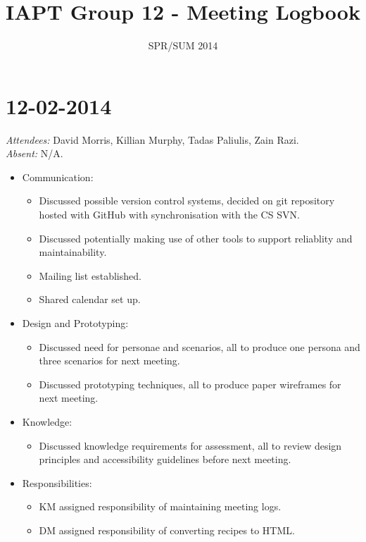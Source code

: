 \documentclass{article}
\title{IAPT Group 12 - Meeting Logbook}
\date{SPR/SUM 2014}
\begin{document}
\maketitle
\clearpage

\section*{12-02-2014}
\vspace{.5cm}
\emph{Attendees: }David Morris, Killian Murphy, Tadas Paliulis, Zain Razi.
\\
\emph{Absent: }N/A.

\begin{itemize}
\item Communication: 
  \begin {itemize}
  \item Discussed possible version control systems, decided on git repository hosted with GitHub with synchronisation with the CS SVN. 
  \item Discussed potentially making use of other tools to support reliablity and maintainability.
  \item Mailing list established.
  \item Shared calendar set up.
  \end{itemize}
\item Design and Prototyping:
  \begin{itemize}
  \item Discussed need for personae and scenarios, all to produce one persona and three scenarios for next meeting.
  \item Discussed prototyping techniques, all to produce paper wireframes for next meeting.
  \end{itemize}
\item Knowledge:
  \begin{itemize}
  \item Discussed knowledge requirements for assessment, all to review design principles and accessibility guidelines before next meeting.
  \end{itemize}
\item Responsibilities:
  \begin{itemize}
  \item KM assigned responsibility of maintaining meeting logs.
  \item DM assigned responsibility of converting recipes to HTML.
  \end{itemize}
\end{itemize}
\end{document}
